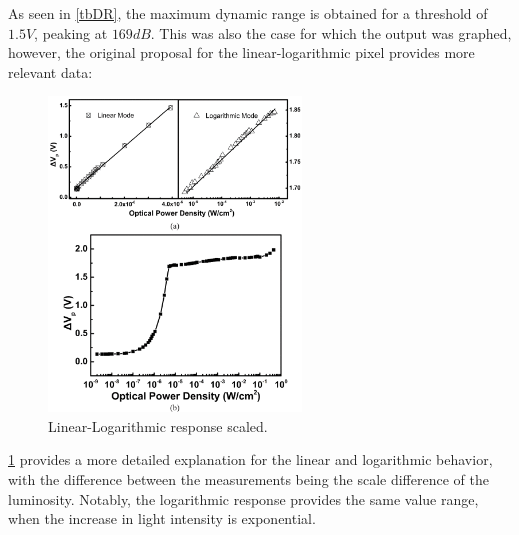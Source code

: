 As seen in \ref{tbDR}, the maximum dynamic range is obtained for a threshold of \(1.5V\), peaking at \(169dB\).
This was also the case for which the output was graphed, however, the original proposal for the linear-logarithmic
pixel provides more relevant data:

\begin{figure}[H]
    \includegraphics[width=0.60\textwidth, height=0.70\textwidth]{resources/png/response.png}
    \caption{Linear-Logarithmic response scaled. \cite{withCompensation} \label{figResponse}}
\end{figure}

\ref{figResponse} provides a more detailed explanation for the linear and logarithmic behavior, with the difference
between the measurements being the scale difference of the luminosity. Notably, the logarithmic response provides
the same value range, when the increase in light intensity is exponential.

